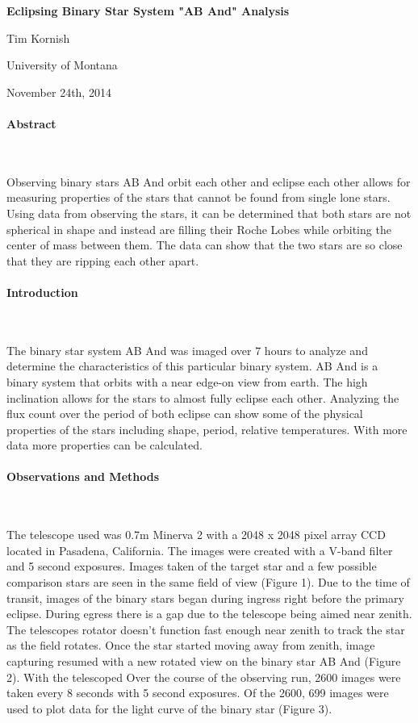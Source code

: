 \documentclass[12pt,twocolumn]{article}
\begin{document}
\begin{center}

{\LARGE{\bf Eclipsing Binary Star System "AB And" Analysis}}

{\large Tim Kornish}

University of Montana

November 24th, 2014
\end{center}

\paragraph{Abstract}
 
 \ \
 
 
 Observing binary stars AB And orbit each other and eclipse each other allows for measuring properties of the stars that cannot be found from single lone stars. Using data from observing the stars, it can be determined that both stars are not spherical in shape and instead are filling their Roche Lobes while orbiting the center of mass between them. The data can show that the two stars are so close that they are ripping each other apart.
 
 \paragraph{Introduction}
 
 \ \
 
 
The binary star system AB And was imaged over 7 hours to analyze and determine the characteristics of this particular binary system. AB And is a binary system that orbits with a near edge-on view from earth. The high inclination allows for the stars to almost fully eclipse each other. Analyzing the flux count over the period of both eclipse can show some of the physical properties of the stars including shape, period, relative temperatures. With more data more properties can be calculated. 
 
\paragraph{Observations and Methods}

\ \


The telescope used was 0.7m Minerva 2 with a 2048 x 2048 pixel array CCD located in Pasadena, California. The images were created with a V-band filter and 5 second exposures. Images taken of the target star and a few possible comparison stars are seen in the same field of view (Figure 1). Due to the time of transit, images of the binary stars began during ingress right before the primary eclipse. During egress there is a gap due to the telescope being aimed near zenith. The telescopes rotator doesn't function fast enough near zenith to track the star as the field rotates. Once the star started moving away from zenith, image capturing resumed with a new rotated view on the binary star AB And (Figure 2). With the telescoped  Over the course of the observing run, 2600 images were taken every 8 seconds with 5 second exposures. Of the 2600, 699 images were used to plot data for the light curve of the binary star (Figure 3). 
\end{document}
